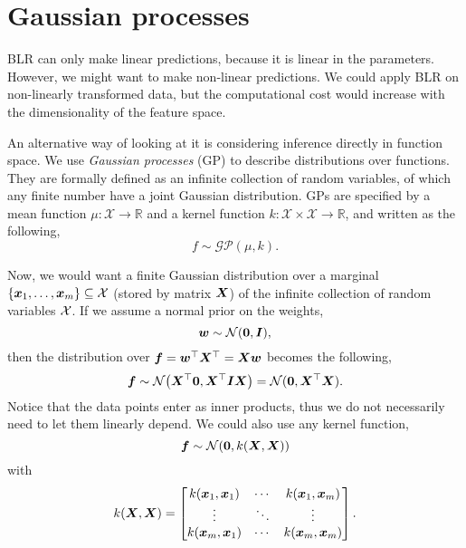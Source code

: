 \section{Gaussian processes}

BLR can only make linear predictions, because it is linear in the parameters.
However, we might want to make non-linear predictions. We could apply BLR on
non-linearly transformed data, but
the computational cost would increase with the dimensionality of the feature
space.

An alternative way of looking at it is considering inference directly in
function space. We use \textit{Gaussian processes} (GP) to describe
distributions over functions. They are formally defined as an infinite
collection of random variables, of which any finite number have a joint Gaussian
distribution. GPs are specified by a mean function $\mu:
\mathcal{X}\to\mathbb{R}$ and a kernel function
$k:\mathcal{X}\times\mathcal{X}\to\mathbb{R}$, and written as the
following, \[
  f \sim \mathcal{GP}(\mu, k)
.\]

Now, we would want a finite Gaussian distribution over a marginal
$\{\bm{x}_1,\ldots,\bm{x}_m\} \subseteq \mathcal{X}$ (stored by matrix $\bm{X}$) of
the infinite collection of random variables $\mathcal{X}$. If we assume a normal prior on
the weights, \[
  \bm{w} \sim \mathcal{N}(\bm{0},\bm{I})
,\]
then the distribution
over $\bm{f} = \bm{w}^\top \bm{X}^\top = \bm{X} \bm{w}$
becomes the following, \[
  \vec{f} \sim \mathcal{N} \lft( \transpose{\mat{X}} \vec{0},\transpose{\mat{X}}
  \mat{I} \mat{X} \rgt) = \mathcal{N}(\vec{0},\transpose{\mat{X}} \mat{X})
.\]
Notice that the data points enter as inner products, thus we do not necessarily
need to let them linearly depend. We could also use any kernel
function,
\[
  \bm{f} \sim \mathcal{N}(\bm{0}, k(\bm{X}, \bm{X}))
\]
with \[
  k(\bm{X}, \bm{X}) = \begin{bmatrix}
    k(\bm{x}_1,\bm{x}_1) & \cdots & k(\bm{x}_1,\bm{x}_m) \\
    \vdots & \ddots & \vdots \\
    k(\bm{x}_m,\bm{x}_1) & \cdots & k(\bm{x}_m,\bm{x}_m)
  \end{bmatrix}
.\]

